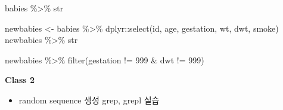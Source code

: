 \documentclass[
]{book}
\newenvironment{Shaded}{\begin{snugshade}}{\end{snugshade}}
\newcommand{\DecValTok}[1]{\textcolor[rgb]{0.00,0.00,0.81}{#1}}
\newcommand{\FunctionTok}[1]{\textcolor[rgb]{0.00,0.00,0.00}{#1}}
\newcommand{\NormalTok}[1]{#1}
\newcommand{\OtherTok}[1]{\textcolor[rgb]{0.56,0.35,0.01}{#1}}
\newcommand{\SpecialCharTok}[1]{\textcolor[rgb]{0.00,0.00,0.00}{#1}}
\providecommand{\tightlist}{%
  \setlength{\itemsep}{0pt}\setlength{\parskip}{0pt}}
\begin{document}
\begin{Shaded}
\begin{Highlighting}[]
\NormalTok{babies }\SpecialCharTok{\%\textgreater{}\%}\NormalTok{ str}

\NormalTok{newbabies }\OtherTok{\textless{}{-}}\NormalTok{ babies }\SpecialCharTok{\%\textgreater{}\%} 
\NormalTok{  dplyr}\SpecialCharTok{::}\FunctionTok{select}\NormalTok{(id, age, gestation, wt, dwt, smoke)}
\NormalTok{newbabies }\SpecialCharTok{\%\textgreater{}\%}\NormalTok{ str}

\NormalTok{newbabies }\SpecialCharTok{\%\textgreater{}\%} 
  \FunctionTok{filter}\NormalTok{(gestation }\SpecialCharTok{!=} \DecValTok{999} \SpecialCharTok{\&}\NormalTok{ dwt }\SpecialCharTok{!=} \DecValTok{999}\NormalTok{) }
\end{Highlighting}
\end{Shaded}

\textbf{Class 2}

\begin{itemize}
\tightlist
\item
  random sequence 생성 grep, grepl 실습
\end{itemize}
\end{document}
